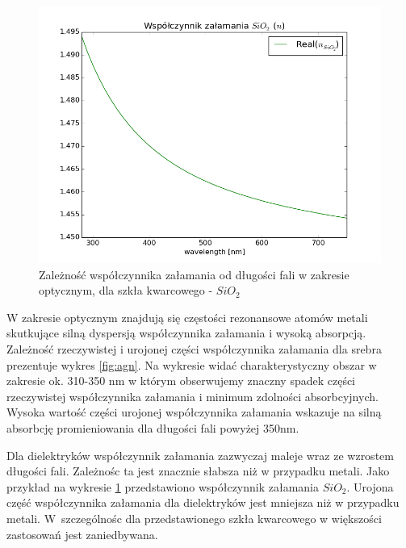 \begin{figure}[tb]
	\includegraphics[width=\textwidth]{images/sio2n.png}
	\caption{Zależność współczynnika załamania od długości fali w zakresie optycznym, dla szkła kwarcowego -  $SiO_2$ \cite{MALITSON:65}   }
	\label{fig:sio2n}
\end{figure}
W zakresie optycznym znajdują się częstości rezonansowe atomów metali skutkujące silną dyspersją współczynnika załamania i wysoką absorpcją. Zależność rzeczywistej i urojonej części współczynnika załamania  dla srebra prezentuje wykres \ref{fig:agn}. Na wykresie widać charakterystyczny obszar w zakresie ok. 310-350 nm w którym obserwujemy znaczny spadek części rzeczywistej współczynnika załamania i minimum zdolności absorbcyjnych. Wysoka wartość części urojonej współczynnika załamania wskazuje na silną absorbcję promieniowania dla długości fali powyżej 350nm.

Dla dielektryków współczynnik załamania zazwyczaj maleje wraz ze wzrostem długości fali. Zależnośc ta jest znacznie słabsza niż w przypadku metali. Jako przykład na wykresie \ref{fig:sio2n} przedstawiono współczynnik załamania $SiO_2$. Urojona część współczynnika załamania dla dielektryków jest mniejsza niż w przypadku metali. W~szczególnośc dla przedstawionego szkła kwarcowego w większości zastosowań jest zaniedbywana.

